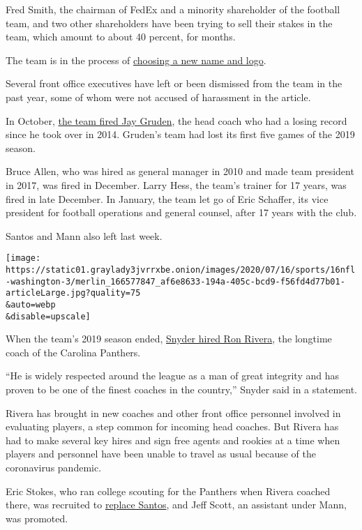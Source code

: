 Fred Smith, the chairman of FedEx and a minority shareholder of the
football team, and two other shareholders have been trying to sell their
stakes in the team, which amount to about 40 percent, for months.

The team is in the process of
\href{https://www.nytimes3xbfgragh.onion/2020/07/16/sports/football/washington-name-change-trademark.html}{choosing
a new name and logo}.

Several front office executives have left or been dismissed from the
team in the past year, some of whom were not accused of harassment in
the article.

In October,
\href{https://www.nytimes3xbfgragh.onion/2019/10/07/sports/jay-gruden-redskins.html}{the
team fired Jay Gruden}, the head coach who had a losing record since he
took over in 2014. Gruden's team had lost its first five games of the
2019 season.

Bruce Allen, who was hired as general manager in 2010 and made team
president in 2017, was fired in December. Larry Hess, the team's trainer
for 17 years, was fired in late December. In January, the team let go of
Eric Schaffer, its vice president for football operations and general
counsel, after 17 years with the club.

Santos and Mann also left last week.

\texttt{[image: https://static01.graylady3jvrrxbe.onion/images/2020/07/16/sports/16nfl-washington-3/merlin\_166577847\_af6e8633-194a-405c-bcd9-f56fd4d77b01-articleLarge.jpg?quality=75\\\&auto=webp\\\&disable=upscale]}

When the team's 2019 season ended,
\href{https://www.nytimes3xbfgragh.onion/2019/12/31/sports/football/ron-rivera-washington-redskins.html}{Snyder
hired Ron Rivera}, the longtime coach of the Carolina Panthers.

``He is widely respected around the league as a man of great integrity
and has proven to be one of the finest coaches in the country,'' Snyder
said in a statement.

Rivera has brought in new coaches and other front office personnel
involved in evaluating players, a step common for incoming head coaches.
But Rivera has had to make several key hires and sign free agents and
rookies at a time when players and personnel have been unable to travel
as usual because of the coronavirus pandemic.

Eric Stokes, who ran college scouting for the Panthers when Rivera
coached there, was recruited to
\href{https://www.washingtonpost.com/sports/2020/07/15/larry-michael-retires-washington-nfl-team/}{replace
Santos}, and Jeff Scott, an assistant under Mann, was promoted.


